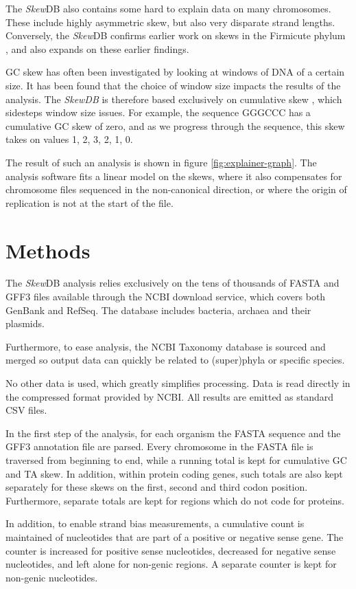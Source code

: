 \documentclass[fleqn,10pt]{wlscirep}
\begin{document}
The \emph{Skew}DB also contains some hard to explain data on many chromosomes. These include highly asymmetric skew, but also very disparate strand lengths. Conversely, the \emph{Skew}DB confirms earlier work on skews in the Firmicute phylum  \cite{charneski_atypical_2011}, and also expands on these earlier findings.

GC skew has often been investigated by looking at windows of DNA of a certain size. It has been found that the choice of window size impacts the results of the analysis. The \emph{SkewDB} is therefore based exclusively on cumulative skew \cite{grigoriev_analyzing_1998}, which sidesteps window size issues. For example, the sequence GGGCCC has a cumulative GC skew of zero, and as we progress through the sequence, this skew takes on values 1, 2, 3, 2, 1, 0.

The result of such an analysis is shown in figure \ref{fig:explainer-graph}. The analysis software fits a linear model on the skews, where it also compensates for chromosome files sequenced in the non-canonical direction, or where the origin of replication is not at the start of the file.

\section*{Methods}
The \emph{Skew}DB analysis relies exclusively on the tens of thousands of FASTA and GFF3 files available through the NCBI download service, which covers both GenBank and RefSeq. The database includes bacteria, archaea and their plasmids.

Furthermore, to ease analysis, the NCBI Taxonomy database is sourced and merged so output data can quickly be related to (super)phyla or specific species.

No other data is used, which greatly simplifies processing. Data is read directly in the compressed format provided by NCBI. All results are emitted as standard CSV files.

In the first step of the analysis, for each organism the FASTA sequence and the GFF3 annotation file are parsed. Every chromosome in the FASTA file is traversed from beginning to end, while a running total is kept for cumulative GC and TA skew. In addition, within protein coding genes, such totals are also kept separately for these skews on the first, second and third codon position. Furthermore, separate totals are kept for regions which do not code for proteins.

In addition, to enable strand bias measurements, a cumulative count is maintained of nucleotides that are part of a positive or negative sense gene. The counter is increased for positive sense nucleotides, decreased for negative sense nucleotides, and left alone for non-genic regions. A separate counter is kept for non-genic nucleotides. 
\end{document}
